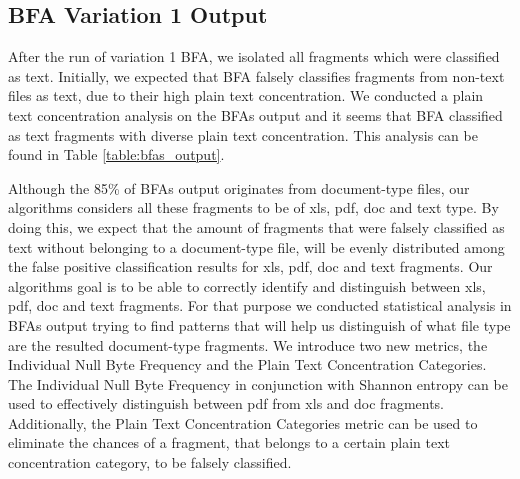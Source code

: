 \subsection{BFA Variation 1 Output}
After the run of variation 1 BFA, we isolated all fragments which were classified as text. Initially, we expected that BFA falsely classifies fragments from non-text files as text, due to their high plain text concentration. We conducted a plain text concentration analysis on the BFAs output and it seems that BFA classified as text fragments with diverse plain text concentration. This analysis can be found in Table \ref{table:bfas_output}.


 Although the 85\% of BFAs output  originates from document-type files, our algorithms considers all these fragments to be of xls, pdf, doc and text type. By doing this, we expect that the amount of fragments that were falsely classified as text without belonging to a document-type file, will be evenly distributed among the false positive classification results for xls, pdf, doc and text fragments. Our algorithms goal is to be able to correctly identify and distinguish between xls, pdf, doc and text fragments. For that purpose we conducted statistical analysis in BFAs output trying to find patterns that will help us distinguish of what file type are the resulted document-type fragments. We introduce two new metrics, the Individual Null Byte Frequency and the Plain Text Concentration Categories.  The Individual Null Byte Frequency in conjunction with Shannon entropy\cite{Shannon} can be used to effectively distinguish  between pdf from xls and doc fragments. Additionally, the Plain Text Concentration Categories metric can be used to eliminate the chances of a fragment, that belongs to a certain plain text concentration category, to be falsely classified.
 


